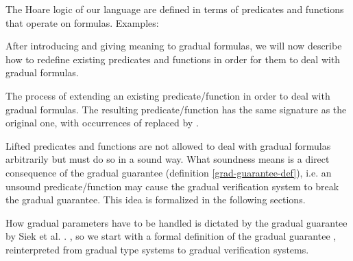 
The Hoare logic of our language are defined in terms of predicates and functions that operate on formulas.
Examples:

After introducing and giving meaning to gradual formulas, we will now describe how to redefine existing predicates and functions in order for them to deal with gradual formulas.

\begin{definition}
    The process of extending an existing predicate/function in order to deal with gradual formulas.
    The resulting predicate/function has the same signature as the original one, with occurrences of \setFormula replaced by \setGFormula.
\end{definition}

Lifted predicates and functions are not allowed to deal with gradual formulas arbitrarily but must do so in a sound way.
What soundness means is a direct consequence of the gradual guarantee (definition \ref{grad-guarantee-def}), i.e. an unsound predicate/function may cause the gradual verification system to break the gradual guarantee.
This idea is formalized in the following sections.


How gradual parameters have to be handled is dictated by the gradual guarantee by Siek et al. \cite{siek2015refined}.
, so we start with a formal definition of the gradual guarantee , reinterpreted from gradual type systems to gradual verification systems.